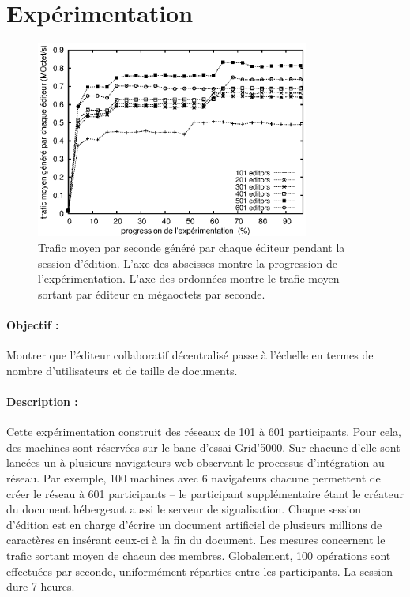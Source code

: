 
\section{Expérimentation}
\label{editor:sec:experimentation}


\begin{figure}
  \begin{center}
    \includegraphics[width=0.8\textwidth]{img/editor/communication.eps}
    \caption[Trafic généré par \CRATE lors de sessions d'édition]
    {\label{editor:img:communication} Trafic moyen par seconde généré par chaque
      éditeur pendant la session d'édition. L'axe des abscisses montre la
      progression de l'expérimentation. L'axe des ordonnées montre le trafic
      moyen sortant par éditeur en mégaoctets par seconde.}
  \end{center}
\end{figure}

\paragraph{Objectif :} Montrer que l'éditeur collaboratif décentralisé \CRATE
passe à l'échelle en termes de nombre d'utilisateurs et de taille de
documents.

\paragraph{Description :} Cette expérimentation construit des réseaux de 101 à
601 participants. Pour cela, des machines sont réservées sur le banc d'essai
Grid'5000. Sur chacune d'elle sont lancées un à plusieurs navigateurs web
observant le processus d'intégration au réseau. Par exemple, 100 machines avec 6
navigateurs chacune permettent de créer le réseau à 601 participants -- le
participant supplémentaire étant le créateur du document hébergeant aussi le
serveur de signalisation.  Chaque session d'édition est en charge d'écrire un
document artificiel de plusieurs millions de caractères en insérant ceux-ci à la
fin du document. Les mesures concernent le trafic sortant moyen de chacun des
membres. Globalement, 100 opérations sont effectuées par seconde, uniformément
réparties entre les participants. La session dure 7 heures.

